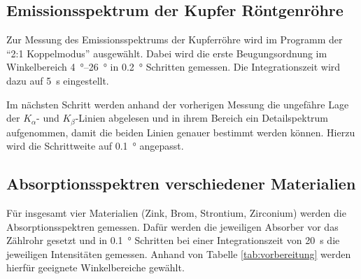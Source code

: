 \subsection{Emissionsspektrum der Kupfer Röntgenröhre}
Zur Messung des Emissionsspektrums der Kupferröhre wird im Programm der \enquote{2:1 Koppelmodus} ausgewählt.
Dabei wird die erste Beugungsordnung im Winkelbereich \qtyrange[]{4}{26}{\degree} in \qty[]{0.2}{\degree} Schritten gemessen.
Die Integrationszeit wird dazu auf \qty[]{5}{\second} eingestellt.

\noindent
Im nächsten Schritt werden anhand der vorherigen Messung die ungefähre Lage der $K_\alpha$- und $K_\beta$-Linien abgelesen
und in ihrem Bereich ein Detailspektrum aufgenommen, damit die beiden Linien genauer bestimmt werden können.
Hierzu wird die Schrittweite auf \qty[]{0.1}{\degree} angepasst.


\subsection{Absorptionsspektren verschiedener Materialien}
Für insgesamt vier Materialien (Zink, Brom, Strontium, Zirconium) werden die Absorptionsspektren gemessen.
Dafür werden die jeweiligen Absorber vor das Zählrohr gesetzt und in \qty[]{0.1}{\degree} Schritten bei einer Integrationszeit 
von \qty[]{20}{\second} die jeweiligen Intensitäten gemessen.
Anhand von Tabelle \ref{tab:vorbereitung} werden hierfür geeignete Winkelbereiche gewählt.